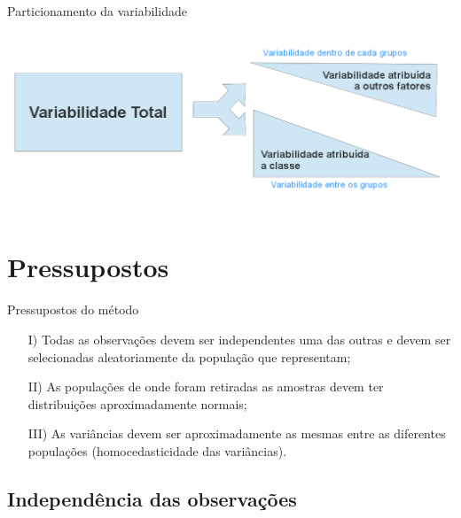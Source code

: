 \documentclass{bredelebeamer}
\begin{document}
\begin{frame}
\begin{block}{Particionamento da variabilidade}
\centering
\includegraphics[scale=.4]{images/particionamento.png}
\end{block}
\end{frame}

\section{Pressupostos}

\begin{frame}
\begin{alertblock}{Pressupostos do método}
\begin{itemize}
\item[I)] Todas as observações devem ser independentes uma das outras e
  devem ser selecionadas aleatoriamente da população que representam;
\vspace{.5cm}
\item[II)] As populações de onde foram retiradas as amostras devem ter
  distribuições aproximadamente normais;
\vspace{.5cm}
\item[III)] As variâncias devem ser aproximadamente as mesmas entre as
  diferentes populações (homocedasticidade das variâncias).
\end{itemize}
\end{alertblock}
\end{frame}

\subsection{Independência das observações}
\end{document}

